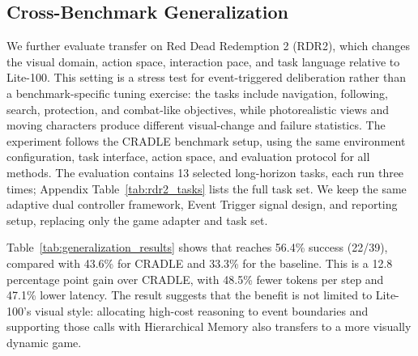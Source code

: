 \subsection{Cross-Benchmark Generalization}



We further evaluate transfer on Red Dead Redemption 2 (RDR2), which changes the
visual domain, action space, interaction pace, and task language relative to
Lite-100. This setting is a stress test for event-triggered deliberation rather
than a benchmark-specific tuning exercise: the tasks include navigation,
following, search, protection, and combat-like objectives, while photorealistic
views and moving characters produce different visual-change and failure
statistics. The experiment follows the CRADLE benchmark setup, using the same
environment configuration, task interface, action space, and evaluation protocol
for all methods. The evaluation contains 13 selected long-horizon tasks, each
run three times; Appendix Table~\mbox{\ref{tab:rdr2_tasks}} lists the full task
set. We keep the same adaptive dual controller framework, Event Trigger signal
design, and reporting setup, replacing only the game adapter and task set.

Table~\mbox{\ref{tab:generalization_results}} shows that \method{} reaches
56.4\% success (22/39), compared with 43.6\% for CRADLE and 33.3\% for the
\stardojo{} baseline. This is a 12.8 percentage point gain over CRADLE, with
48.5\% fewer tokens per step and 47.1\% lower latency. The result suggests that
the benefit is not limited to Lite-100's visual style: allocating high-cost
reasoning to event boundaries and supporting those calls with Hierarchical
Memory also transfers to a more visually dynamic game.

\FloatBarrier
\endgroup
